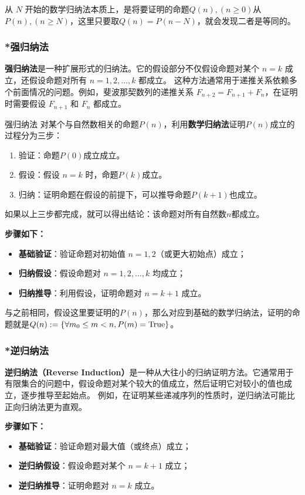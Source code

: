 从 $N$ 开始的数学归纳法本质上，是将要证明的命题$Q(n),(n\geq 0)$从$P(n),(n\geq N)$，这里只要取$Q(n)=P(n-N)$，就会发现二者是等同的。

\subsubsection{*强归纳法}

\textbf{强归纳法}是一种扩展形式的归纳法。它的假设部分不仅假设命题对某个 $n = k$ 成立，还假设命题对所有 $n = 1, 2, \dots, k$ 都成立。  
这种方法通常用于递推关系依赖多个前面情况的问题。例如，斐波那契数列的递推关系 $F_{n+2} = F_{n+1} + F_n$，在证明时需要假设 $F_{n+1}$ 和 $F_n$ 都成立。
\begin{definition}{强归纳法}
对某个与自然数相关的命题$P(n)$，利用\textbf{数学归纳法}证明$P(n)$成立的过程分为三步：
\begin{enumerate}
\item 验证：命题$P(0)$成立成立。
\item 假设：假设 $n = k$ 时，命题$P(k)$成立。
\item 归纳：证明命题在假设的前提下，可以推导命题$P(k+1)$也成立。
\end{enumerate}
如果以上三步都完成，就可以得出结论：该命题对所有自然数$n$都成立。
\end{definition}
\textbf{步骤如下：}
\begin{itemize}
    \item \textbf{基础验证}：验证命题对初始值 $n = 1, 2$（或更大初始点）成立；
    \item \textbf{归纳假设}：假设命题对 $n = 1, 2, \dots, k$ 均成立；
    \item \textbf{归纳推导}：利用假设，证明命题对 $n = k+1$ 成立。
\end{itemize}

与之前相同，假设这里要证明的$P(n)$，那么对应到基础的数学归纳法，证明的命题就是$Q(n):=\{\forall m_0\leq m<n,P(m)=\rm{True}\}$。

\subsubsection{*逆归纳法}

\textbf{逆归纳法（Reverse Induction）}是一种从大往小的归纳证明方法。它通常用于有限集合的问题中，假设命题对某个较大的值成立，然后证明它对较小的值也成立，逐步推导至起始点。  
例如，在证明某些递减序列的性质时，逆归纳法可能比正向归纳法更为直观。

\textbf{步骤如下：}
\begin{itemize}
    \item \textbf{基础验证}：验证命题对最大值（或终点）成立；
    \item \textbf{逆归纳假设}：假设命题对某个 $n = k+1$ 成立；
    \item \textbf{逆归纳推导}：证明命题对 $n = k$ 成立。
\end{itemize}


